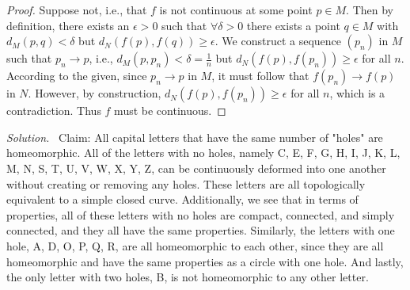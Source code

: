 \documentclass[12pt]{article}
\renewcommand{\_}[1]{\underline{ #1 }}
\theoremstyle{definition}
\newenvironment{exercise}[1]
  {\renewcommand\theinnercustomthm{#1}\innercustomthm}
  {\endinnercustomthm}
\newenvironment{solution}{\par\noindent\textit{Solution.}\ }{\par}
\numberwithin{equation}{subsection}
\begin{document}
\begin{exercise}{13}
    \begin{proof}
        Suppose not, i.e., that $f$ is not continuous at some point $p \in M$. Then by definition, there exists an $\epsilon > 0$ such that $\forall \delta > 0$ there exists a point $q \in M$ with $d_M(p, q) < \delta$ but $d_N(f(p), f(q)) \ge \epsilon$. We construct a sequence $(p_n)$ in $M$ such that $p_n \to p$, i.e., $d_M (p, p_n) < \delta = \frac{1}{n}$ but $d_N(f(p), f(p_n)) \ge \epsilon$ for all $n$. According to the given, since $p_n \to p$ in $M$, it must follow that $f(p_n) \to f(p)$ in $N$. However, by construction, $d_N (f(p), f(p_n)) \ge \epsilon$ for all $n$, which is a contradiction. Thus $f$ must be continuous. 
    \end{proof}
\end{exercise}

\begin{exercise}{17}
    \begin{solution}
        Claim: All capital letters that have the same number of "holes" are homeomorphic. All of the letters with no holes, namely C, E, F, G, H, I, J, K, L, M, N, S, T, U, V, W, X, Y, Z, can be continuously deformed into one another without creating or removing any holes. These letters are all topologically equivalent to a simple closed curve. Additionally, we see that in terms of properties, all of these letters with no holes are compact, connected, and simply connected, and they all have the same properties. Similarly, the letters with one hole, A, D, O, P, Q, R, are all homeomorphic to each other, since they are all homeomorphic and have the same properties as a circle with one hole. And lastly, the only letter with two holes, B, is not homeomorphic to any other letter.
    \end{solution}
\end{exercise}
\end{document}
